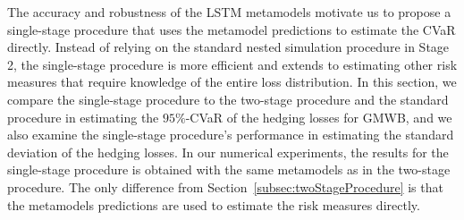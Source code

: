 \documentclass{article}
\begin{document}
The accuracy and robustness of the LSTM metamodels motivate us to propose a single-stage procedure that uses the metamodel predictions to estimate the CVaR directly.
Instead of relying on the standard nested simulation procedure in Stage 2, the single-stage procedure is more efficient and extends to estimating other risk measures that require knowledge of the entire loss distribution.
In this section, we compare the single-stage procedure to the two-stage procedure and the standard procedure in estimating the $95\%$-CVaR of the hedging losses for GMWB, and we also examine the single-stage procedure's performance in estimating the standard deviation of the hedging losses. 
In our numerical experiments, the results for the single-stage procedure is obtained with the same metamodels as in the two-stage procedure.
The only difference from Section~\ref{subsec:twoStageProcedure} is that the metamodels predictions are used to estimate the risk measures directly.
\end{document}
